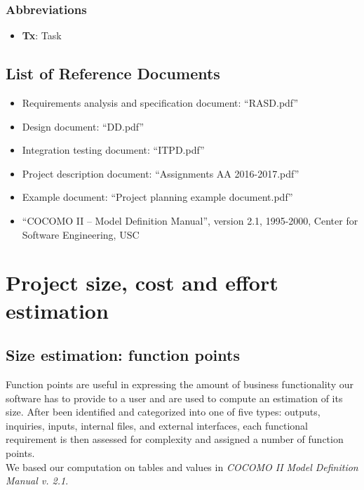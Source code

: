 \documentclass[english]{article}
\begin{document}
\subsubsection{Abbreviations}
\begin{itemize}
	\item{\textbf{Tx}: Task}
\end{itemize}

\subsection{List of Reference Documents}

\begin{itemize}
	\item{Requirements analysis and specification document: “RASD.pdf”}
	\item{Design document: “DD.pdf”}
	\item{Integration testing document: “ITPD.pdf”}
	\item{Project description document: “Assignments AA 2016-2017.pdf”}
	\item{Example document: “Project planning example document.pdf”}
	\item{“COCOMO II -- Model Definition Manual”, version 2.1, 1995-2000, Center for Software Engineering, USC} %
\end{itemize}

\section{Project size, cost and effort estimation}


\subsection{Size estimation: function points}
Function points are useful in expressing the amount of business functionality our software has to provide to a user and are used to compute an estimation of its size.
After been identified and categorized into one of five types: outputs, inquiries, inputs, internal files, and external interfaces, each functional requirement is then assessed for complexity and assigned a number of function points.\\
We based our computation on tables and values in \emph{COCOMO II Model Definition Manual v. 2.1}.
\end{document}
